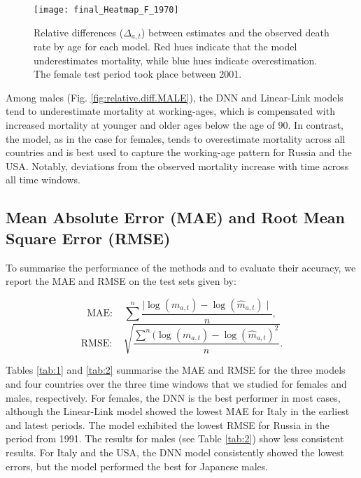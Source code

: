 \documentclass[a4,11pt]{article}
\begin{document}
\begin{figure}[H]
	\centering
	\texttt{[image: final\_Heatmap\_F\_1970]}\\
	 \caption{Relative differences ($\Delta_{a,t}$) between estimates and the observed death rate by age for each model. Red hues indicate that the model underestimates mortality, while blue hues indicate overestimation. The female test period took place between 2001.}
	 \label{fig:relative.diff}
\end{figure}

Among males (Fig. \ref{fig:relative.diff.MALE}), the DNN and Linear-Link models tend to underestimate mortality at working-ages, which is compensated with increased mortality at younger and older ages below the age of 90. In contrast, the \citet{Sevcikova} model, as in the case for females, tends to overestimate mortality across all countries and is best used to capture the working-age pattern for Russia and the USA. Notably, deviations from the observed mortality increase with time across all time windows.

\subsection*{Mean Absolute Error (MAE) and Root Mean Square Error (RMSE)}

To summarise the performance of the methods and to evaluate their accuracy, we report the MAE and RMSE on the test sets given by:

\begin{equation*}
	\text{MAE}: \quad \sum^{n} \frac{\mid \log(m_{a,t}) - \log(\hat{m}_{a,t}) \mid}{n},
	\end{equation*}
	\begin{equation*}
	\text{RMSE}: \quad \sqrt{\frac{\sum^{n} (\log(m_{a,t}) - \log(\hat{m}_{a,t})^2}{n}}. 
\end{equation*}

Tables \ref{tab:1} and \ref{tab:2} summarise the MAE and RMSE for the three models and four countries over the three time windows that we studied for females and males, respectively. For females, the DNN is the best performer in most cases, although the Linear-Link model showed the lowest MAE for Italy in the earliest and latest periods. The \citet{Sevcikova} model exhibited the lowest RMSE for Russia in the period from 1991. The results for males (see Table \ref{tab:2}) show less consistent results. For Italy and the USA, the DNN model consistently showed the lowest errors, but the \citet{Sevcikova} model performed the best for Japanese males. 
\end{document}
